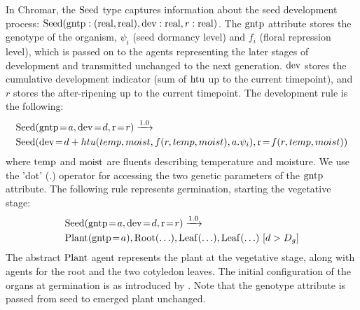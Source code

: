In Chromar, the \(\mathrm{Seed}\) type captures information about the seed
development process:
\(\mathrm{Seed}(\mathrm{gntp}:(\mathrm{real},\mathrm{real}),\mathrm{dev}:\mathrm{real},r:\mathrm{real})\).  The
\(\mathrm{gntp}\) attribute stores the genotype of the organism, \(\psi_{i}\) (seed
dormancy level) and \(f_{i}\) (floral repression level), which is passed on to
the agents representing the later stages of development and transmitted
unchanged to the next generation.  \(\mathrm{dev}\) stores the cumulative
development indicator (sum of \(\mathrm{htu}\) up to the current timepoint), and
\(r\) stores the after-ripening up to the current timepoint. The development
rule is the following:
\begin{equation*}
\begin{split}
& \mr{Seed}(\ar{gntp}{a}, \ar{dev}{d}, \ar{r}{r}) \xrightarrow{1.0} \\ 
&\mr{Seed}(\ar{dev}{d + htu(temp, moist, f(r,temp,moist), a.\psi_i)}, 
\ar{r}{f(r, temp, moist)})
\end{split}
\end{equation*}
where \(\mathrm{temp}\) and \(\mathrm{moist}\) are fluents describing
temperature and moisture. We use the 'dot' (\(.\)) operator for
accessing the two genetic parameters of the \(\mathrm{gntp}\) attribute.
The following rule represents germination, starting the vegetative
stage:
\begin{equation*}
\begin{split}
& \mr{Seed}(\ar{gntp}{a},\ar{dev}{d},\ar{r}{r} ) \xrightarrow{1.0} \\
& \mr{Plant}(\ar{gntp}{a}), \mr{Root}(\ldots),\mr{Leaf}( \ldots ), \mr{Leaf}(\ldots) \, \, \lbrack d > D_{g}\rbrack
\end{split}
\end{equation*}
The abstract \(\mathrm{Plant}\) agent represents the plant at the vegetative stage,
along with agents for the root and the two cotyledon leaves. The initial
configuration of the organs at germination is as introduced by
\citet{chew_multiscale_2014}. Note that the genotype attribute is passed from
seed to emerged plant unchanged.

